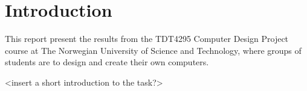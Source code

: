 \chapter{Introduction}
This report present the results from the TDT4295 Computer Design Project course at The Norwegian University of Science and Technology, where groups of students are to design and create their own computers.

<insert a short introduction to the task?>



